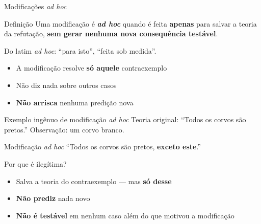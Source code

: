 \documentclass[aspectratio=169]{beamer}
\newcommand{\impt}[1]{\textcolor{maccent}{\textbf{#1}}}
\newcommand{\ntc}[1]{\textcolor{mprimary}{#1}}
\begin{document}
\begin{frame}{Modificações \emph{ad hoc}}
\begin{block}{Definição}
Uma modificação é \impt{\emph{ad hoc}} quando é feita \impt{apenas} para salvar a teoria da refutação, \impt{sem gerar nenhuma nova consequência testável}.
\end{block}
\pause
\vspace{0.5cm}
\ntc{Do latim \emph{ad hoc}:} ``para isto'', ``feita sob medida''.
\pause
\vspace{0.3cm}
\begin{itemize}
  \item A modificação resolve \impt{só aquele} contraexemplo
  \item Não diz nada sobre outros casos
  \item \impt{Não arrisca} nenhuma predição nova
\end{itemize}
\end{frame}

\begin{frame}{Exemplo ingênuo de modificação \emph{ad hoc}}
\ntc{Teoria original:} ``Todos os corvos são pretos.''
\pause
\vspace{0.3cm}
\ntc{Observação:} um corvo branco.
\pause
\vspace{0.5cm}
\begin{alertblock}{Modificação \emph{ad hoc}}
``Todos os corvos são pretos, \impt{exceto este}.''
\end{alertblock}
\pause
\vspace{0.4cm}
\ntc{Por que é ilegítima?}
\begin{itemize}
  \item Salva a teoria do contraexemplo --- mas \impt{só desse}
  \pause
  \item \impt{Não prediz} nada novo
  \pause
  \item \impt{Não é testável} em nenhum caso além do que motivou a modificação
\end{itemize}
\end{frame}
\end{document}
